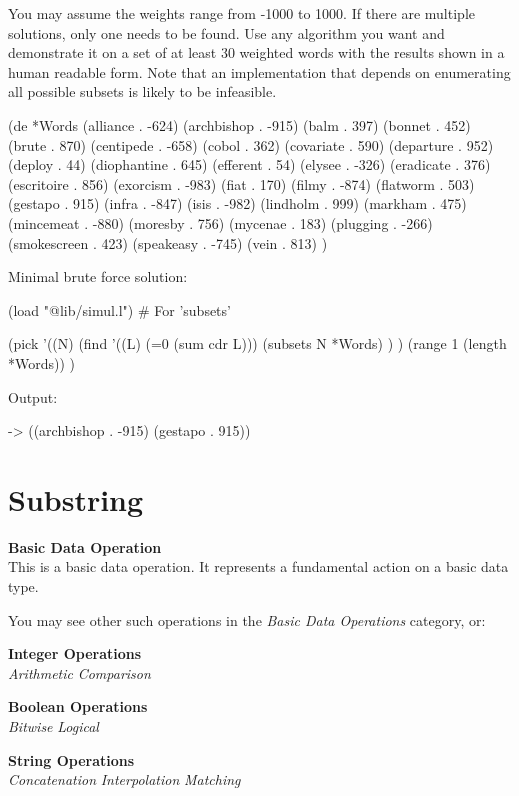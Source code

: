 You may assume the weights range from -1000 to 1000. If there are
multiple solutions, only one needs to be found. Use any algorithm you
want and demonstrate it on a set of at least 30 weighted words with the
results shown in a human readable form. Note that an implementation that
depends on enumerating all possible subsets is likely to be infeasible.

\begin{wideverbatim}

(de *Words
   (alliance . -624) (archbishop . -915) (balm . 397) (bonnet . 452)
   (brute . 870) (centipede . -658) (cobol . 362) (covariate . 590)
   (departure . 952) (deploy . 44) (diophantine . 645) (efferent . 54)
   (elysee . -326) (eradicate . 376) (escritoire . 856) (exorcism . -983)
   (fiat . 170) (filmy . -874) (flatworm . 503) (gestapo . 915)
   (infra . -847) (isis . -982) (lindholm . 999) (markham . 475)
   (mincemeat . -880) (moresby . 756) (mycenae . 183) (plugging . -266)
   (smokescreen . 423) (speakeasy . -745) (vein . 813) )

Minimal brute force solution:

(load "@lib/simul.l")  # For 'subsets'

(pick
   '((N)
      (find '((L) (=0 (sum cdr L)))
         (subsets N *Words) ) )
   (range 1 (length *Words)) )

Output:

-> ((archbishop . -915) (gestapo . 915))

\end{wideverbatim}

\pagebreak{}
\section*{Substring}

\textbf{Basic Data Operation}\\ This is a basic data operation. It
represents a fundamental action on a basic data type.

You may see other such operations in the
\emph{Basic Data Operations}
category, or:

\textbf{Integer Operations} \\
\emph{Arithmetic} \textbar{}
\emph{Comparison}

\textbf{Boolean Operations} \\ \emph{Bitwise}
\textbar{} \emph{Logical}

\textbf{String Operations} \\
\emph{Concatenation} \textbar{}
\emph{Interpolation} \textbar{}
\emph{Matching}

